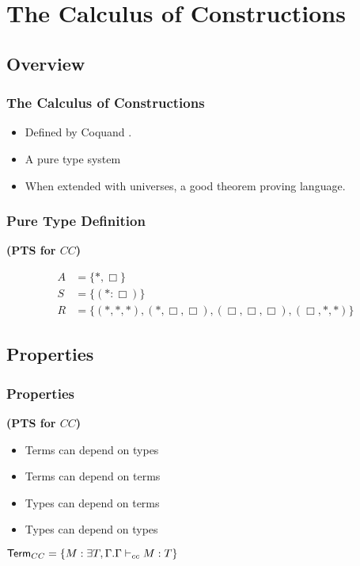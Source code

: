 \section[$CC$]{The Calculus of Constructions}

\subsection[Overview]{Overview}

\begin{frame}
\frametitle{The Calculus of Constructions}
\begin{itemize}
\item Defined by Coquand \citep{coquand1986calculus}.
\item A pure type system
\item When extended with universes, a good theorem proving language.

\end{itemize}
\end{frame}


\begin{frame}
\frametitle{Pure Type Definition}

\begin{definition}
\textbf{(PTS for $CC$)}

\begin{align}
A &= \{ *, \Box \}
\\
S &= \{ (* : \Box) \}
\\
R &= \{ (*,*,*),(*,\Box,\Box),(\Box,\Box,\Box),(\Box,*,*)\}
\end{align}  
\end{definition}

\end{frame}

\subsection{Properties}

\begin{frame}
\frametitle{Properties}

\textbf{(PTS for $CC$)}

\begin{itemize}
\item Terms can depend on types
\item Terms can depend on terms
\item Types can depend on terms
\item Types can depend on types
\end{itemize}

\begin{definition}
$ \mathsf{Term}_{CC}  = \{ M : \exists T,\Gamma . \Gamma \vdash_{cc} M : T \}$
\end{definition}

\end{frame}


